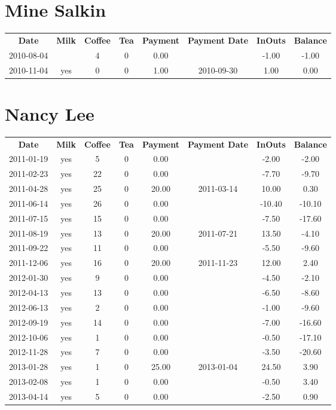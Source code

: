 \section{Mine Salkin}

\begin{center}
\begin{tabular}{cccccccc}
\textbf{Date} & \textbf{Milk} & \textbf{Coffee} & \textbf{Tea} & \textbf{Payment} & \textbf{Payment Date} & \textbf{InOuts} & \textbf{Balance} \\
2010-08-04 &  & 4 & 0 & 0.00 &  & -1.00 & -1.00\\ 
2010-11-04 & yes & 0 & 0 & 1.00 & 2010-09-30 &  1.00 &  0.00
\end{tabular}
\end{center}

\section{Nancy Lee}

\begin{center}
\begin{tabular}{cccccccc}
\textbf{Date} & \textbf{Milk} & \textbf{Coffee} & \textbf{Tea} & \textbf{Payment} & \textbf{Payment Date} & \textbf{InOuts} & \textbf{Balance} \\
2011-01-19 & yes &  5 & 0 &  0.00 &  &  -2.00 &  -2.00\\ 
2011-02-23 & yes & 22 & 0 &  0.00 &  &  -7.70 &  -9.70\\ 
2011-04-28 & yes & 25 & 0 & 20.00 & 2011-03-14 &  10.00 &   0.30\\ 
2011-06-14 & yes & 26 & 0 &  0.00 &  & -10.40 & -10.10\\ 
2011-07-15 & yes & 15 & 0 &  0.00 &  &  -7.50 & -17.60\\ 
2011-08-19 & yes & 13 & 0 & 20.00 & 2011-07-21 &  13.50 &  -4.10\\ 
2011-09-22 & yes & 11 & 0 &  0.00 &  &  -5.50 &  -9.60\\ 
2011-12-06 & yes & 16 & 0 & 20.00 & 2011-11-23 &  12.00 &   2.40\\ 
2012-01-30 & yes &  9 & 0 &  0.00 &  &  -4.50 &  -2.10\\ 
2012-04-13 & yes & 13 & 0 &  0.00 &  &  -6.50 &  -8.60\\ 
2012-06-13 & yes &  2 & 0 &  0.00 &  &  -1.00 &  -9.60\\ 
2012-09-19 & yes & 14 & 0 &  0.00 &  &  -7.00 & -16.60\\ 
2012-10-06 & yes &  1 & 0 &  0.00 &  &  -0.50 & -17.10\\ 
2012-11-28 & yes &  7 & 0 &  0.00 &  &  -3.50 & -20.60\\ 
2013-01-28 & yes &  1 & 0 & 25.00 & 2013-01-04 &  24.50 &   3.90\\ 
2013-02-08 & yes &  1 & 0 &  0.00 &  &  -0.50 &   3.40\\ 
2013-04-14 & yes &  5 & 0 &  0.00 &  &  -2.50 &   0.90
\end{tabular}
\end{center}


